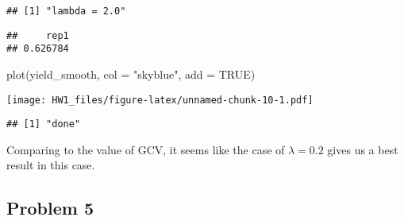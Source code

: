 \documentclass[
]{article}
\newenvironment{Shaded}{\begin{snugshade}}{\end{snugshade}}
\newcommand{\AttributeTok}[1]{\textcolor[rgb]{0.77,0.63,0.00}{#1}}
\newcommand{\ConstantTok}[1]{\textcolor[rgb]{0.00,0.00,0.00}{#1}}
\newcommand{\FunctionTok}[1]{\textcolor[rgb]{0.00,0.00,0.00}{#1}}
\newcommand{\NormalTok}[1]{#1}
\newcommand{\SpecialCharTok}[1]{\textcolor[rgb]{0.00,0.00,0.00}{#1}}
\newcommand{\StringTok}[1]{\textcolor[rgb]{0.31,0.60,0.02}{#1}}
\begin{document}
\begin{verbatim}
## [1] "lambda = 2.0"
\end{verbatim}

\begin{Shaded}
\end{Shaded}

\begin{verbatim}
##     rep1 
## 0.626784
\end{verbatim}

\begin{Shaded}
\begin{Highlighting}[]
\FunctionTok{plot}\NormalTok{(yield\_smooth, }\AttributeTok{col =} \StringTok{"skyblue"}\NormalTok{, }\AttributeTok{add =} \ConstantTok{TRUE}\NormalTok{)}
\end{Highlighting}
\end{Shaded}

\texttt{[image: HW1\_files/figure-latex/unnamed-chunk-10-1.pdf]}

\begin{verbatim}
## [1] "done"
\end{verbatim}

Comparing to the value of GCV, it seems like the case of
\(\lambda = 0.2\) gives us a best result in this case.

\hypertarget{problem-5}{%
\subsection{Problem 5}\label{problem-5}}
\end{document}
